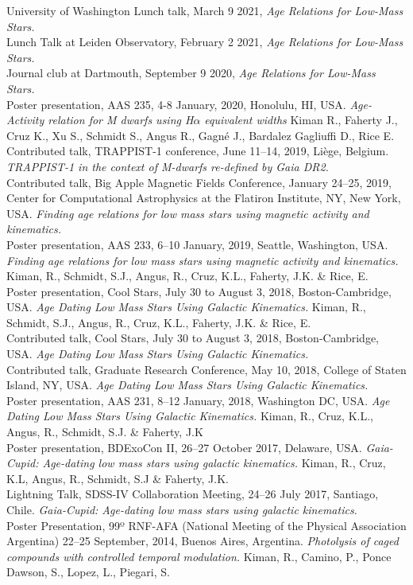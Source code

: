\documentclass[10pt]{cv}
\begin{document}
\begin{llist}
University of Washington Lunch talk, March 9 2021, \textit{Age Relations for Low-Mass Stars.}\\
Lunch Talk at Leiden Observatory, February 2 2021, \textit{Age Relations for Low-Mass Stars.}\\
Journal club at Dartmouth, September 9 2020, \textit{Age Relations for Low-Mass Stars.}\\
Poster presentation, AAS 235, 4-8 January, 2020, Honolulu, HI, USA. \textit{Age-Activity relation for M dwarfs using H$\alpha$ equivalent widths} Kiman R., Faherty J., Cruz K., Xu S., Schmidt S., Angus R., Gagn\'e J., Bardalez Gagliuffi D., Rice E.\\
Contributed talk, TRAPPIST-1 conference, June 11--14, 2019, Li\`ege, Belgium. \textit{TRAPPIST-1 in the context of M-dwarfs re-defined by Gaia DR2.}\\
Contributed talk, Big Apple Magnetic Fields Conference, January 24--25, 2019, Center for Computational Astrophysics at the Flatiron Institute, NY, New York, USA. \textit{Finding age relations for low mass stars using magnetic activity and kinematics.}\\
Poster presentation, AAS 233, 6--10 January, 2019, Seattle, Washington, USA. \textit{Finding age relations for low mass stars using magnetic activity and kinematics.} Kiman, R., Schmidt, S.J., Angus, R., Cruz, K.L., Faherty, J.K. \& Rice, E.\\
Poster presentation, Cool Stars, July 30 to August 3, 2018, Boston-Cambridge, USA. \textit{Age Dating Low Mass Stars Using Galactic Kinematics.} Kiman, R., Schmidt, S.J., Angus, R., Cruz, K.L., Faherty, J.K. \& Rice, E.\\
Contributed talk, Cool Stars, July 30 to August 3, 2018, Boston-Cambridge, USA. \textit{Age Dating Low Mass Stars Using Galactic Kinematics.} \\
Contributed talk, Graduate Research Conference, May 10, 2018, College of Staten Island, NY, USA. \textit{Age Dating Low Mass Stars Using Galactic Kinematics.}\\
Poster presentation, AAS 231, 8--12 January, 2018, Washington DC, USA. \textit{Age Dating Low Mass Stars Using Galactic Kinematics.} Kiman, R., Cruz, K.L., Angus, R., Schmidt, S.J. \& Faherty, J.K\\
Poster presentation, BDExoCon II, 26--27 October 2017, Delaware, USA. \textit{Gaia-Cupid: Age-dating low mass stars using galactic kinematics.} Kiman, R., Cruz, K.L, Angus, R., Schmidt, S.J \& Faherty, J.K.\\
Lightning Talk, SDSS-IV Collaboration Meeting, 24--26 July 2017, Santiago, Chile. \textit{Gaia-Cupid: Age-dating low mass stars using galactic kinematics.} \\
Poster Presentation, 99º RNF-AFA (National Meeting of the Physical Association Argentina) 22--25 September, 2014, Buenos Aires, Argentina. \textit{Photolysis of caged compounds with controlled temporal modulation.} Kiman, R., Camino, P., Ponce Dawson, S., Lopez, L., Piegari, S.


\end{llist}
\end{document}

